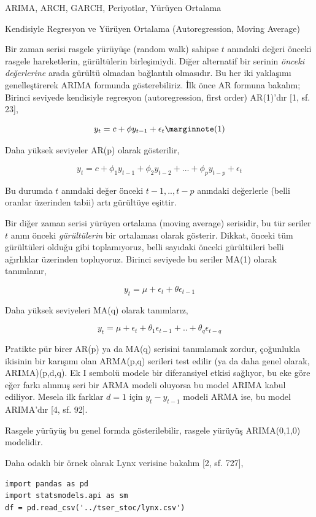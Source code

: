 \documentclass[12pt,fleqn]{article}\usepackage{../../common}
\begin{document}
ARIMA, ARCH, GARCH, Periyotlar, Yürüyen Ortalama

Kendisiyle Regresyon ve Yürüyen Ortalama (Autoregression, Moving Average)

Bir zaman serisi rasgele yürüyüşe (random walk) sahipse $t$ anındaki değeri
önceki rasgele hareketlerin, gürültülerin birleşimiydi. Diğer alternatif
bir serinin {\em önceki değerlerine} arada gürültü olmadan bağlantılı
olmasıdır. Bu her iki yaklaşımı genelleştirerek ARIMA formunda
gösterebiliriz. İlk önce AR formuna bakalım; Birinci seviyede kendisiyle
regresyon (autoregression, first order) AR(1)'dır [1, sf. 23],

$$ 
y_t = c + \phi y_{t-1} + \epsilon_t  
\mlabel{1} 
$$

Daha yüksek seviyeler AR(p) olarak gösterilir, 

$$ y_t = c + \phi_1 y_{t-1} +  \phi_2 y_{t-2} + ... +  \phi_p y_{t-p}  + \epsilon_t  $$

Bu durumda $t$ anındaki değer önceki $t-1,..,t-p$ anındaki değerlerle
(belli oranlar üzerinden tabii) artı gürültüye eşittir.

Bir diğer zaman serisi yürüyen ortalama (moving average) serisidir, bu
tür seriler $t$ anını önceki {\em gürültülerin} bir ortalaması olarak
gösterir. Dikkat, önceki tüm gürültüleri olduğu gibi toplamıyoruz, belli
sayıdaki önceki gürültüleri belli ağırlıklar üzerinden topluyoruz. Birinci
seviyede bu seriler MA(1) olarak tanımlanır,

$$ y_t = \mu + \epsilon_t + \theta \epsilon_{t-1} $$

Daha yüksek seviyeleri MA(q) olarak tanımlarız, 

$$ y_t = \mu + \epsilon_t + \theta_1 \epsilon_{t-1} + .. + \theta_q \epsilon_{t-q} $$

Pratikte pür birer AR(p) ya da MA(q) serisini tanımlamak zordur, çoğunlukla
ikisinin bir karışımı olan ARMA(p,q) serileri test edilir (ya da daha genel
olarak, AR\textbf{I}MA)(p,d,q). Ek I sembolü modele bir diferansiyel etkisi
sağlıyor, bu eke göre eğer farkı alınmış seri bir ARMA modeli oluyorsa bu
model ARIMA kabul ediliyor. Mesela ilk farklar $d=1$ için $y_t - y_{t-1}$
modeli ARMA ise, bu model ARIMA'dır [4, sf. 92].

Rasgele yürüyüş bu genel formda gösterilebilir, rasgele yürüyüş
ARIMA(0,1,0) modelidir. 

Daha odaklı bir örnek olarak Lynx verisine bakalım [2, sf. 727],

\begin{verbatim}
import pandas as pd
import statsmodels.api as sm
df = pd.read_csv('../tser_stoc/lynx.csv')
\end{verbatim}
\end{document}
